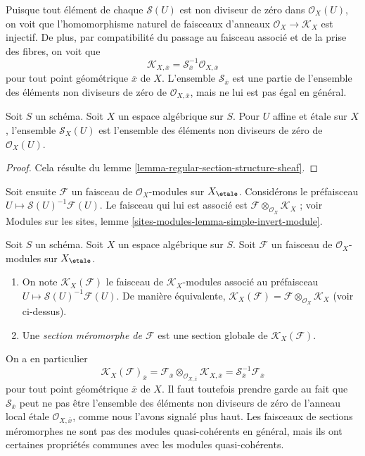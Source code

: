\noindent
Puisque tout élément de chaque $\mathcal{S}(U)$ est non diviseur de zéro dans
$\mathcal{O}_X(U)$, on voit que l'homomorphisme naturel de faisceaux
d'anneaux $\mathcal{O}_X \to \mathcal{K}_X$ est injectif.
De plus, par compatibilité du passage au faisceau associé et de la prise des fibres,
on voit que
$$
\mathcal{K}_{X, \overline{x}} =
\mathcal{S}_{\overline{x}}^{-1}\mathcal{O}_{X, \overline{x}}
$$
pour tout point géométrique $\overline{x}$ de $X$. L'ensemble
$\mathcal{S}_{\overline{x}}$ est une partie de
l'ensemble des éléments non diviseurs de zéro de $\mathcal{O}_{X, \overline{x}}$, mais
ne lui est pas égal en général.

\begin{lemma}
\label{lemma-describe-S}
Soit $S$ un schéma. Soit $X$ un espace algébrique sur $S$.
Pour $U$ affine et \'etale sur $X$, l'ensemble
$\mathcal{S}_X(U)$ est l'ensemble des éléments non diviseurs de zéro de
$\mathcal{O}_X(U)$.
\end{lemma}

\begin{proof}
Cela résulte du lemme \ref{lemma-regular-section-structure-sheaf}.
\end{proof}

\noindent
Soit ensuite $\mathcal{F}$ un faisceau de $\mathcal{O}_X$-modules
sur $X_\etale$.
Considérons le préfaisceau $U \mapsto \mathcal{S}(U)^{-1}\mathcal{F}(U)$.
Le faisceau qui lui est associé est
$\mathcal{F} \otimes_{\mathcal{O}_X} \mathcal{K}_X$ ; voir
Modules sur les sites, lemme \ref{sites-modules-lemma-simple-invert-module}.

\begin{definition}
\label{definition-meromorphic-section}
Soit $S$ un schéma. Soit $X$ un espace algébrique sur $S$.
Soit $\mathcal{F}$ un faisceau de $\mathcal{O}_X$-modules
sur $X_\etale$.
\begin{enumerate}
\item On note $\mathcal{K}_X(\mathcal{F})$ le faisceau de
$\mathcal{K}_X$-modules associé au préfaisceau
$U \mapsto \mathcal{S}(U)^{-1}\mathcal{F}(U)$. De manière équivalente,
$\mathcal{K}_X(\mathcal{F}) =
\mathcal{F} \otimes_{\mathcal{O}_X} \mathcal{K}_X$ (voir ci-dessus).
\item Une {\it section méromorphe de $\mathcal{F}$}
est une section globale de $\mathcal{K}_X(\mathcal{F})$.
\end{enumerate}
\end{definition}

\noindent
On a en particulier
$$
\mathcal{K}_X(\mathcal{F})_{\overline{x}}
=
\mathcal{F}_{\overline{x}}
\otimes_{\mathcal{O}_{X, \overline{x}}} \mathcal{K}_{X, \overline{x}}
=
\mathcal{S}_{\overline{x}}^{-1}\mathcal{F}_{\overline{x}}
$$
pour tout point géométrique $\overline{x}$ de $X$. Il faut toutefois prendre garde
au fait que $\mathcal{S}_{\overline{x}}$ peut ne pas être l'ensemble des
éléments non diviseurs de zéro de l'anneau local \'etale $\mathcal{O}_{X, \overline{x}}$,
comme nous l'avons signalé plus haut. Les faisceaux de sections méromorphes ne sont pas
des modules quasi-cohérents en général, mais ils ont certaines propriétés communes
avec les modules quasi-cohérents.

